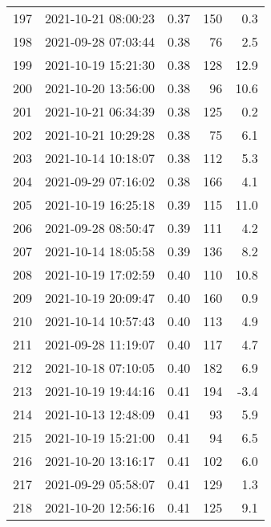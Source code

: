 \begin{tabular}{llrrr}
197 & 2021-10-21 08:00:23 &  0.37 &             150 &                    0.3 \\
198 & 2021-09-28 07:03:44 &  0.38 &              76 &                    2.5 \\
199 & 2021-10-19 15:21:30 &  0.38 &             128 &                   12.9 \\
200 & 2021-10-20 13:56:00 &  0.38 &              96 &                   10.6 \\
201 & 2021-10-21 06:34:39 &  0.38 &             125 &                    0.2 \\
202 & 2021-10-21 10:29:28 &  0.38 &              75 &                    6.1 \\
203 & 2021-10-14 10:18:07 &  0.38 &             112 &                    5.3 \\
204 & 2021-09-29 07:16:02 &  0.38 &             166 &                    4.1 \\
205 & 2021-10-19 16:25:18 &  0.39 &             115 &                   11.0 \\
206 & 2021-09-28 08:50:47 &  0.39 &             111 &                    4.2 \\
207 & 2021-10-14 18:05:58 &  0.39 &             136 &                    8.2 \\
208 & 2021-10-19 17:02:59 &  0.40 &             110 &                   10.8 \\
209 & 2021-10-19 20:09:47 &  0.40 &             160 &                    0.9 \\
210 & 2021-10-14 10:57:43 &  0.40 &             113 &                    4.9 \\
211 & 2021-09-28 11:19:07 &  0.40 &             117 &                    4.7 \\
212 & 2021-10-18 07:10:05 &  0.40 &             182 &                    6.9 \\
213 & 2021-10-19 19:44:16 &  0.41 &             194 &                   -3.4 \\
214 & 2021-10-13 12:48:09 &  0.41 &              93 &                    5.9 \\
215 & 2021-10-19 15:21:00 &  0.41 &              94 &                    6.5 \\
216 & 2021-10-20 13:16:17 &  0.41 &             102 &                    6.0 \\
217 & 2021-09-29 05:58:07 &  0.41 &             129 &                    1.3 \\
218 & 2021-10-20 12:56:16 &  0.41 &             125 &                    9.1 \\

\end{tabular}
